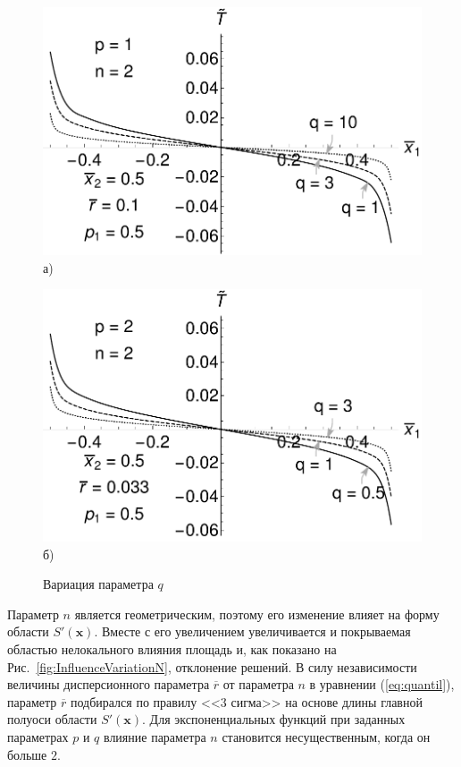 \begin{figure}[ht]
    \begin{minipage}[b][][b]{0.49\linewidth}\centering
        \includegraphics[width=\linewidth]{pics/TPolyInfluenceVariationQ.pdf} \\ а)
    \end{minipage}
    \hfill
    \begin{minipage}[b][][b]{0.49\linewidth}\centering
        \includegraphics[width=\linewidth]{pics/TExpInfluenceVariationQ.pdf} \\ б)
    \end{minipage}
    \caption{Вариация параметра $q$}
    \label{fig:InfluenceVariationQ}
\end{figure}

Параметр $n$ является геометрическим, поэтому его изменение влияет на форму области $S'(\boldsymbol{x})$. Вместе с его увеличением увеличивается и покрываемая областью нелокального влияния площадь и, как показано на Рис.~\ref{fig:InfluenceVariationN}, отклонение решений. В силу независимости величины дисперсионного параметра $\overline{r}$ от параметра $n$ в уравнении (\ref{eq:quantil}), параметр $\overline{r}$ подбирался по правилу <<3 сигма>> на основе длины главной полуоси области $S'(\boldsymbol{x})$. Для экспоненциальных функций при заданных параметрах $p$ и $q$ влияние параметра $n$ становится несущественным, когда он больше $2$.

